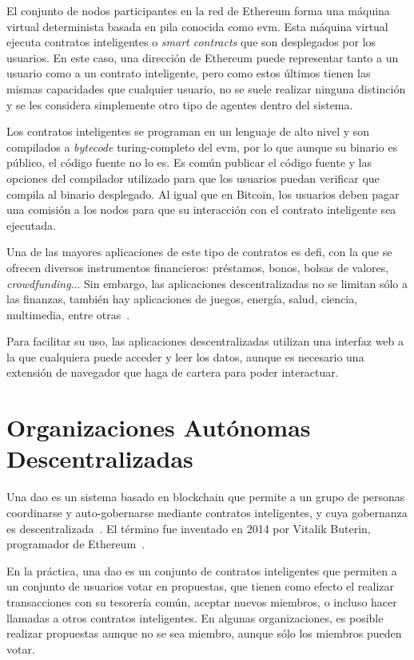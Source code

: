 El conjunto de nodos participantes en la red de Ethereum forma una máquina virtual determinista basada en pila conocida como \gls{evm}. Esta máquina virtual ejecuta contratos inteligentes o \textit{smart contracts} que son desplegados por los usuarios. En este caso, una dirección de Ethereum puede representar tanto a un usuario como a un contrato inteligente, pero como estos últimos tienen las mismas capacidades que cualquier usuario, no se suele realizar ninguna distinción y se les considera simplemente otro tipo de agentes dentro del sistema.

Los contratos inteligentes se programan en un lenguaje de alto nivel y son compilados a \textit{bytecode} turing-completo del \gls{evm}, por lo que aunque su binario es público, el código fuente no lo es. Es común publicar el código fuente y las opciones del compilador utilizado para que los usuarios puedan verificar que compila al binario desplegado. Al igual que en Bitcoin, los usuarios deben pagar una comisión a los nodos para que su interacción con el contrato inteligente sea ejecutada.

Una de las mayores aplicaciones de este tipo de contratos es \gls{defi}, con la que se ofrecen diversos instrumentos financieros: préstamos, bonos, bolsas de valores, \textit{crowdfunding}... Sin embargo, las aplicaciones descentralizadas no se limitan sólo a las finanzas, también hay aplicaciones de juegos, energía, salud, ciencia, multimedia, entre otras~\cite{wu_first_2021}.

Para facilitar su uso, las aplicaciones descentralizadas utilizan una interfaz web a la que cualquiera puede acceder y leer los datos, aunque es necesario una extensión de navegador que haga de cartera para poder interactuar.

\section{Organizaciones Autónomas Descentralizadas}

Una \acrfull{dao} es un sistema basado en blockchain que permite a un grupo de personas coordinarse y auto-gobernarse mediante contratos inteligentes, y cuya gobernanza es descentralizada~\cite{hassan_decentralized_2021}. El término fue inventado en 2014 por Vitalik Buterin, programador de Ethereum~\cite{buterin_daos_2014}.

En la práctica, una \gls{dao} es un conjunto de contratos inteligentes que permiten a un conjunto de usuarios votar en propuestas, que tienen como efecto el realizar transacciones con su tesorería común, aceptar nuevos miembros, o incluso hacer llamadas a otros contratos inteligentes. En algunas organizaciones, es posible realizar propuestas aunque no se sea miembro, aunque sólo los miembros pueden votar.

